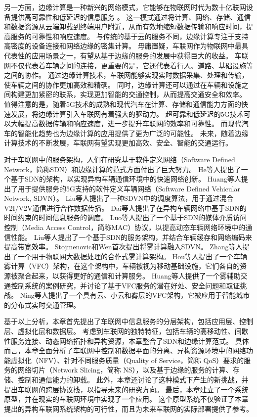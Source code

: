 另一方面，边缘计算是一种新兴的网络模式，它能够在物联网时代为数十亿联网设备提供高可靠性和低延迟的信息服务 \cite{shi2016edge}。
这一模式通过将计算、网络、存储、通信和数据资源从云端卸载到终端用户附近，从而有效地缩短数据传输和响应时间，提高服务的可靠性和响应速度。
与传统的基于云的服务不同，边缘计算专注于支持高密度的设备连接和网络边缘的密集计算。
毋庸置疑，车联网作为物联网中最具代表性的应用场景之一，有望从基于边缘的服务的发展中获得巨大的收益。
车联网不仅代表着车辆之间的连接，更重要的是，它还代表着行人、道路、基础设施等之间的协作。
通过边缘计算技术，车联网能够实现实时数据采集、处理和传输，使车辆之间的协作更加高效和精确。
同时，边缘计算还可以通过在车辆和设施之间构建更加紧密的联系，实现更加智能的交通控制，从而提高交通安全和效率。
值得注意的是，随着5G技术的成熟和现代汽车在计算、存储和通信能力方面的快速发展，将边缘计算引入车联网有着强大的驱动力。
超可靠和低延迟的5G技术可以大幅提高数据传输和响应速度，进一步提升车联网的效率和可靠性。
而现代汽车的智能化趋势也为边缘计算的应用提供了更为广泛的可能性。
未来，随着边缘计算技术的不断发展，车联网有望实现更加高效、安全、智能的交通运行。

对于车联网中的服务架构，人们在研究基于软件定义网络（Software Defined Network，简称SDN）和边缘计算的范式方面付出了巨大努力。
He等人\cite{he2016sdvn}提出了一个基于SDN的架构，以实现异构车辆通信环境中的快速网络创新。
Huang等人\cite{huang2017exploring}提出了用于提供服务的5G支持的软件定义车辆网络（Software Defined Vehicular Network, SDVN）。
Liu等人\cite{liu2016cooperative}提出了一种SDVN中的调度算法，用于通过混合V2I/V2V通信进行合作数据传播。
Dai等人\cite{dai2018cooperative}提出了在异构车辆网络中基于SDN的时间约束的时间信息服务的调度。
Luo等人\cite{luo2018sdnmac}提出了一个基于SDN的媒体介质访问控制（Media Access Control，简称MAC）协议，以提高动态车辆网络环境中的通信性能。
Liu等人\cite{liu2018coding}提出了一个基于SDN的服务架构，并结合车辆缓存和网络编码来提高带宽效率。
Stojmenovic和Wen\cite{stojmenovic2014the}首次提出将雾计算融入SDVN。
Zhang等人\cite{zhang2017cooperative}提出了一个用于物联网大数据处理的合作式雾计算架构。
Hou等人\cite{hou2016vehicular}提出了一个车辆雾计算（VFC）架构，在这个架构中，车辆被视为移动基础设施，它们各自的资源被聚合起来，以获得更好的通信和计算服务。
Huang等人\cite{huang2017vehicular}提供了一个雾辅助交通控制系统的案例研究，并讨论了基于VFC服务的潜在好处、安全问题和取证挑战。
Ning等人\cite{ning2019vehicular}提出了一个具有云、小云和雾层的VFC架构，它被应用于智能城市的分布式实时交通管理。

基于以上分析，本章首先提出了车联网中信息服务的分层架构，包括应用层、控制层、虚拟化层和数据层。
考虑到车联网的独特特征，包括车辆的高移动性、间歇性服务连接、动态网络拓扑和异构资源，本章整合了SDN和边缘计算范式。
具体而言，本章全面分析了车联网中控制和数据平面的分离、异构资源环境中的网络功能虚拟化（NFV）、针对不同服务质量（Quality of Service，简称 QoS）要求的服务的网络切片（Network Slicing，简称 NS），以及基于边缘的服务的计算、存储、控制和通信能力的卸载。
此外，本章还讨论了这种模式下产生的新挑战，并提出车联网的跨层协议栈，以指导未来的研究方向。
最后，本章建立了一个系统原型，并在现实的车联网环境中实现了一个应用。
这个原型系统不仅验证了本章提出的异构车联网系统架构的可行性，而且为未来车联网的实际部署提供了参考。

